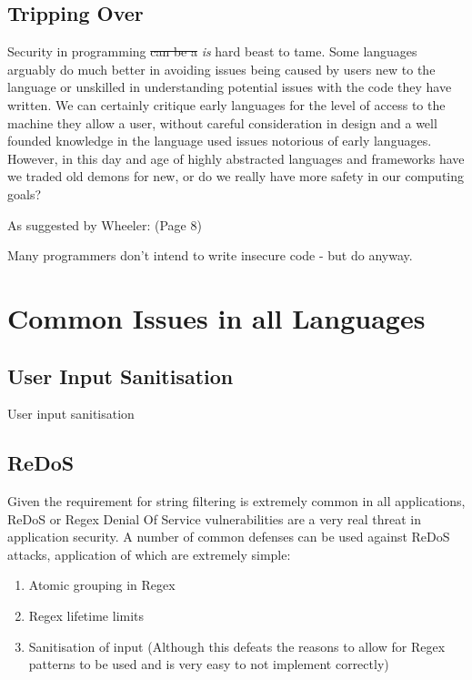 \documentclass[
    a4paper,
    12pt,
    headings=normal
]{article}
\begin{document}
    \subsection{Tripping Over}
        Security in programming \sout{can be a} \textit{is} hard beast to tame. Some languages arguably do much better
        in avoiding issues being caused by users new to the language or unskilled in 
        understanding potential issues with the code they have written.
        We can certainly critique early languages for the level of access to the machine they allow 
        a user, without careful consideration in design and a well founded knowledge in the language 
        used issues notorious of early languages. However, in this day and age of highly abstracted 
        languages and frameworks have we traded old demons for new, or do we really have more safety
        in our computing goals?

        As suggested by Wheeler:\cite{Wheeler} (Page 8)
        \begin{displayquote}
            Many programmers don’t intend to write insecure code - but do anyway.
        \end{displayquote}

    \newpage
    \section{Common Issues in all Languages}
        \subsection{User Input Sanitisation}
            User input sanitisation 

        \subsection{ReDoS}
            Given the requirement for string filtering is extremely common in all applications,
            ReDoS or Regex Denial Of Service\cite{ReDoS} vulnerabilities are a very real threat in application security.
            A number of common defenses can be used against ReDoS attacks, application of 
            which are extremely simple:
            \begin{enumerate}
                \item Atomic grouping in Regex
                \item Regex lifetime limits
                \item Sanitisation of input (Although this defeats the reasons to allow for
                Regex patterns to be used and is very easy to not implement correctly)
            \end{enumerate}
\end{document}
